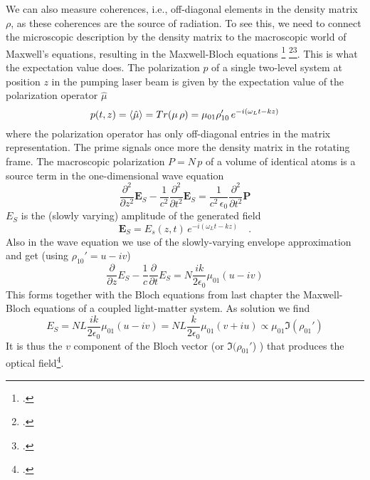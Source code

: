 We can also measure coherences, i.e., off-diagonal elements in the density matrix $\rho$, as these coherences are the source of radiation. To see this, we need to connect the microscopic description by the density matrix to the macroscopic world of Maxwell's equations, resulting in the Maxwell-Bloch equations \footcite[chapter 8.3]{MilonniEberly1988} \footcite[chapter 3.9]{Rand2016}\footcite{Meschede-OLL}. This is what the expectation value does. The  polarization $p$ of a single two-level system at position $z$ in the pumping laser beam is given by the expectation value of the polarization operator $\hat{\mu}$
\begin{equation}
 p(t,z) = \braket{\hat{\mu}} = Tr ( \mu \, \rho) = \mu_{01} \rho_{10}'  \, e^{-i (\omega_L t - k z)}  
\end{equation}
where the polarization operator has only off-diagonal entries in the matrix representation. The prime signals once more the density matrix in the rotating frame. The macroscopic polarization $P = N \, p$ of a volume of identical atoms is a source term in the one-dimensional wave equation
\begin{equation}
  \frac{\partial^2}{\partial z^2} \boldsymbol{E}_S  - \frac{1}{c^2} \frac{\partial^2}{\partial t^2} \boldsymbol{E}_S 
 =  
\frac{1}{c^2\, \epsilon_0} \frac{\partial^2}{\partial t^2} \boldsymbol{P}  
\end{equation}
$E_S$ is the (slowly varying) amplitude of the generated field
\begin{equation}
 \boldsymbol{E}_S =   E_s(z,t) \, e^{-i (\omega_L t - k z)}   \quad .
\end{equation}
Also in the wave equation we  use of the slowly-varying envelope approximation and get (using $\rho_{10}' = u - i v$)
\begin{equation}
  \frac{\partial}{\partial z} E_S  - \frac{1}{c} \frac{\partial}{\partial t} E_S
 =  
N \frac{i k }{2 \epsilon_0}  \mu_{01} ( u - i v)
\end{equation}
This forms together with the Bloch equations from last chapter the Maxwell-Bloch equations of a coupled light-matter system. As solution we find
\begin{equation}
 E_S = N L \frac{i k }{2 \epsilon_0}  \mu_{01} ( u - i v)
 =
  N L \frac{k }{2 \epsilon_0}  \mu_{01} (v + i u)
  \propto \mu_{01} \Im (\rho_{01}' ) 
\end{equation}
It is thus the $v$ component of the Bloch vector (or $\Im (\rho_{01}'$) ) that produces the optical field\footcite[chapter V.B.1]{CT-atom-photon}.
%


